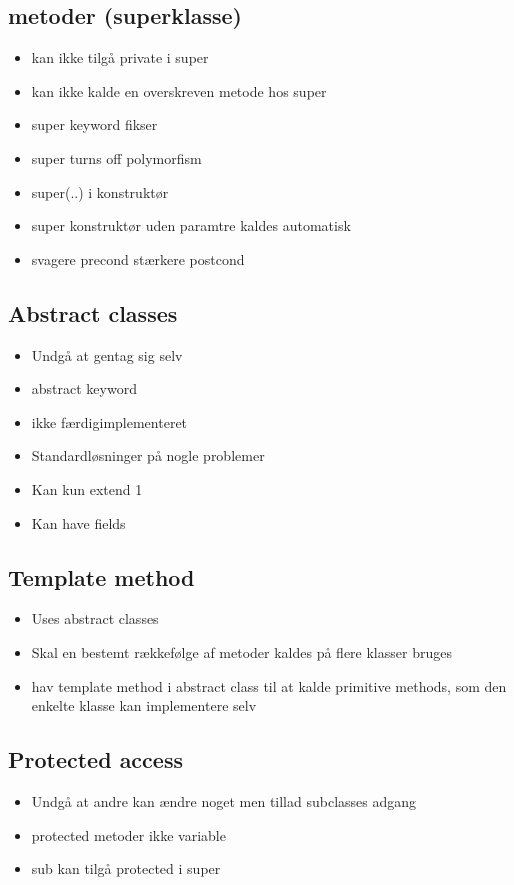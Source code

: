 \subsection{metoder (superklasse)} %
\label{sub:metoder_}
\begin{itemize}
    \item kan ikke tilgå private i super
    \item kan ikke kalde en overskreven metode hos super
    \item super keyword fikser
    \item super turns off polymorfism
    \item super(..) i konstruktør
    \item super konstruktør uden paramtre kaldes automatisk
    \item svagere precond stærkere postcond
\end{itemize}
\subsection{Abstract classes} %
\label{sub:abstract_classes}
\begin{itemize}
    \item Undgå at gentag sig selv
    \item abstract keyword
    \item ikke færdigimplementeret
    \item Standardløsninger på nogle problemer
    \item Kan kun extend 1
    \item Kan have fields
\end{itemize}
\subsection{Template method} %
\label{sub:template_method}
\begin{itemize}
    \item Uses abstract classes
    \item Skal en bestemt rækkefølge af metoder kaldes på flere klasser bruges
    \item hav template method i abstract class til at kalde primitive methods, som den enkelte klasse kan implementere selv
\end{itemize}
\subsection{Protected access} %
\label{sub:protected_access}
\begin{itemize}
    \item Undgå at andre kan ændre noget men tillad subclasses adgang
    \item protected metoder ikke variable
    \item sub kan tilgå protected i super
\end{itemize}
